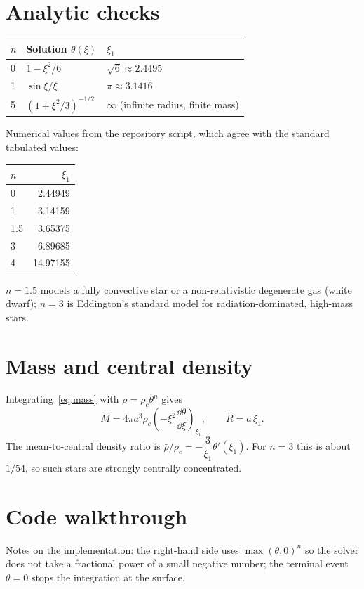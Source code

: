 \section{Analytic checks}
\begin{center}
\begin{tabular}{@{}lll@{}}
\toprule
$n$ & Solution $\theta(\xi)$ & $\xi_1$ \\ \midrule
0 & $1-\xi^2/6$ & $\sqrt6 \approx 2.4495$ \\
1 & $\sin\xi/\xi$ & $\pi \approx 3.1416$ \\
5 & $(1+\xi^2/3)^{-1/2}$ & $\infty$ (infinite radius, finite mass) \\
\bottomrule
\end{tabular}
\end{center}
Numerical values from the repository script, which agree with the standard tabulated values:
\begin{center}
\begin{tabular}{@{}lr@{}}
\toprule
$n$ & $\xi_1$ \\ \midrule
0 & 2.44949 \\
1 & 3.14159 \\
1.5 & 3.65375 \\
3 & 6.89685 \\
4 & 14.97155 \\
\bottomrule
\end{tabular}
\end{center}
$n=1.5$ models a fully convective star or a non-relativistic degenerate gas (white dwarf); $n=3$ is Eddington's standard model for radiation-dominated, high-mass stars.

\section{Mass and central density}
Integrating~\eqref{eq:mass} with $\rho=\rho_c\theta^n$ gives
\[
M = 4\pi a^3\rho_c\left(-\xi^2\frac{\dd\theta}{\dd\xi}\right)_{\xi_1},
\qquad R = a\,\xi_1 .
\]
The mean-to-central density ratio is $\bar\rho/\rho_c = -\dfrac{3}{\xi_1}\theta'(\xi_1)$. For $n=3$ this is about $1/54$, so such stars are strongly centrally concentrated.

\section{Code walkthrough}


Notes on the implementation: the right-hand side uses $\max(\theta,0)^n$ so the solver does not take a fractional power of a small negative number; the terminal event $\theta=0$ stops the integration at the surface.

